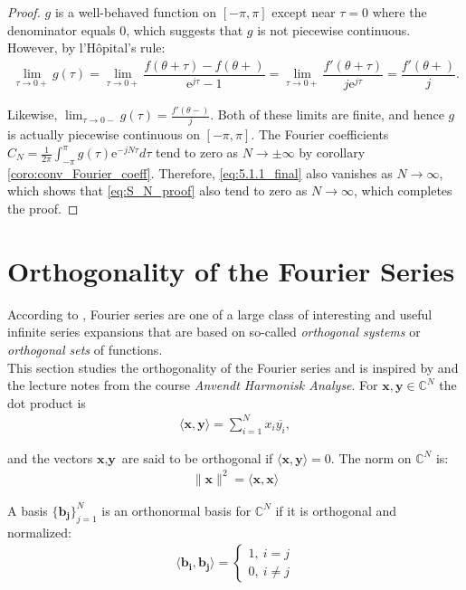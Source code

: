 \begin{proof}
	$g$ is a well-behaved function on $[-\pi,\pi]$ except near 		$\tau = 0$ where the denominator equals 0, which suggests 		that $g$ is not piecewise continuous. However, by 				l'Hôpital's rule:
	\begin{align*}
		\lim_{\tau \to 0+} g(\tau) = \lim_{\tau \to 0+} 				\dfrac{f(\theta + \tau) - f(\theta+)}{\text{e}^{j				\tau}-1} = \lim_{\tau \to 0+} \dfrac{f'(\theta + \tau)}			{j\text{e}^{j\tau}} = \dfrac{f'(\theta+)}{j}.
	\end{align*}
	
	Likewise, $\displaystyle{\lim_{\tau \to 0-}} g(\tau) = 			\frac{f'(\theta-)}{j}$. Both of these limits are finite, 		and hence $g$ is actually piecewise continuous on $[-\pi,		\pi]$. The Fourier coefficients $C_N = \frac{1}{2\pi} 			\int_{-\pi}^\pi g(\tau)\text{e}^{-jN\tau} d\tau$ tend to 		zero as $N 	\to \pm \infty$ by corollary 						\ref{coro:conv_Fourier_coeff}. 	Therefore,
	\eqref{eq:5.1.1_final} also vanishes as $N \to \infty$, 		which shows that \eqref{eq:S_N_proof} also tend to zero as 		$N \to \infty$, which completes the proof.
\end{proof}

\section{Orthogonality of the Fourier Series} \label{sec:FS_ort}
According to \cite{page 62, FAA}, Fourier series are one of a large class of interesting and useful infinite series expansions that are based on so-called \textit{orthogonal systems} or \textit{orthogonal sets} of functions.\\
This section studies the orthogonality of the Fourier series and is inspired by \cite{pages 62-77, FAA} and the lecture notes from the course \textit{Anvendt Harmonisk Analyse}.
For $\textbf{x},\textbf{y} \in \mathbb{C}^N$ the dot product is
\begin{align*}
\langle \textbf{x},\textbf{y} \rangle = \sum_{i=1}^N x_i \overline{y_i},
\end{align*}

and the vectors $\textbf{x},\textbf{y}$ are said to be orthogonal if $\langle \textbf{x},\textbf{y} \rangle = 0$. The norm on $\mathbb{C}^N$ is:
\begin{align*}
\|\textbf{x}\|^2 = \langle \textbf{x},\textbf{x} \rangle
\end{align*}

A basis $\{\textbf{b}_\textbf{j}\}_{j=1}^N$ is an orthonormal basis for $\mathbb{C}^N$ if it is orthogonal and normalized:
\begin{align*}
\langle \textbf{b}_\textbf{i}, \textbf{b}_\textbf{j} \rangle =
\begin{cases}
	1, \ i = j \\
	0, \ i \neq j
\end{cases}
\end{align*}

